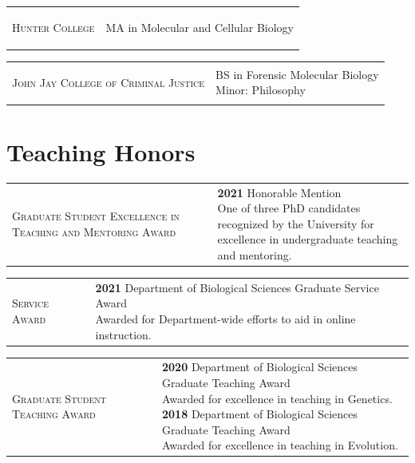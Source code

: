 \documentclass[]{article}
\begin{document}
\vspace{3mm}

\begin{tabular}{l | l}
\parbox{0.30\textwidth}{
\begin{center}
\textsc{Hunter College}
\end{center}
}
&
\parbox{0.65\textwidth}{
MA in Molecular and Cellular Biology
}
\end{tabular}

\vspace{3mm}

\begin{tabular}{l | l}
\parbox{0.30\textwidth}{
\begin{center}
\textsc{John Jay College of Criminal Justice}
\end{center}
}
&
\parbox{0.65\textwidth}{
BS in Forensic Molecular Biology\\
Minor: Philosophy
}
\end{tabular}

\section{\fontsize{16}{48}\selectfont Teaching Honors}
\begin{tabular}{l | l}
\parbox{0.30\textwidth}{
\begin{center}
\textsc{Graduate Student Excellence in Teaching and Mentoring Award}
\end{center}
}
&
\parbox{0.70\textwidth}{
\textbf{2021} Honorable Mention\\
One of three PhD candidates recognized by the University for\\ excellence in undergraduate teaching and mentoring.
}
\end{tabular}

\vspace{3mm}

\begin{tabular}{l | l}
\parbox{0.30\textwidth}{
\begin{center}
\textsc{Service Award}
\end{center}
}
&
\parbox{0.70\textwidth}{
\textbf{2021} Department of Biological Sciences Graduate Service Award\\
Awarded for Department-wide efforts to aid in online instruction.
}
\end{tabular}

\vspace{3mm}

\begin{tabular}{l | l}
\parbox{0.30\textwidth}{
\begin{center}
\textsc{Graduate Student Teaching Award}
\end{center}
}
&
\parbox{0.70\textwidth}{
\textbf{2020} Department of Biological Sciences Graduate Teaching Award\\
Awarded for excellence in teaching in Genetics.\\
\textbf{2018} Department of Biological Sciences Graduate Teaching Award\\
Awarded for excellence in teaching in Evolution.
}
\end{tabular}
\end{document}
